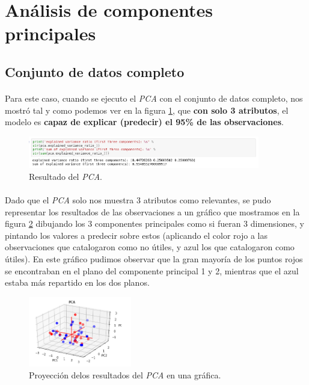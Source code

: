 \section{Análisis de componentes principales}
\label{resultados:pca}

\subsection{Conjunto de datos completo}

\paragraph{}
Para este caso, cuando se ejecuto el \textit{PCA} con el conjunto de datos completo, nos mostró tal y como podemos ver en la figura \ref{pcaOneResult}, que \textbf{con solo 3 atributos}, el modelo es \textbf{capaz de explicar (predecir) el 95\% de las observaciones}.

\begin{figure}[!htb]
  \centering
    \includegraphics[width=0.9\textwidth]{images/resultados_procesado_de_datos_pca1_result.png}
    \caption{Resultado del \textit{PCA}.}
  \label{pcaOneResult}
\end{figure}

\paragraph{}
Dado que el \textit{PCA} solo nos muestra 3 atributos como relevantes, se pudo representar los resultados de las observaciones a un gráfico que mostramos en la figura \ref{pcaOneGraphic} dibujando los 3 componentes principales como si fueran 3 dimensiones, y pintando los valores a predecir sobre estos (aplicando el color rojo a las observaciones que catalogaron como no útiles, y azul los que catalogaron como útiles). En este gráfico pudimos observar que la gran mayoría de los puntos rojos se encontraban en el plano del componente principal 1 y 2, mientras que el azul estaba más repartido en los dos planos.

\begin{figure}[!htb]
  \centering
    \includegraphics[width=0.4\textwidth]{images/resultados_procesado_de_datos_pca1_graphic.png}
    \caption{Proyección delos resultados del \textit{PCA} en una gráfica.}
  \label{pcaOneGraphic}
\end{figure}

